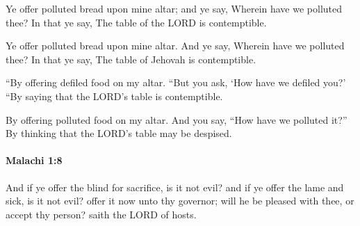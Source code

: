 			Ye offer polluted bread upon mine altar; and ye say, Wherein have we polluted thee? In that ye say, The table of the LORD is contemptible.

			\begin{versebox}
					\item[BHS] 
					\item[LXX] 
					\item[ASV] Ye offer polluted bread upon mine altar. And ye say, Wherein have we polluted thee? In that ye say, The table of Jehovah is contemptible.
					\item[NIV] “By offering defiled food on my altar. “But you ask, ‘How have we defiled you?’ “By saying that the LORD’s table is contemptible.
					\item[NRSV] By offering polluted food on my altar. And you say, “How have we polluted it?” By thinking that the LORD’s table may be despised.
			\end{versebox}

		\paragraph{Malachi 1:8} %
			\label{MALACHI-1-8}

			And if ye offer the blind for sacrifice, is it not evil? and if ye offer the lame and sick, is it not evil? offer it now unto thy governor; will he be pleased with thee, or accept thy person? saith the LORD of hosts.

